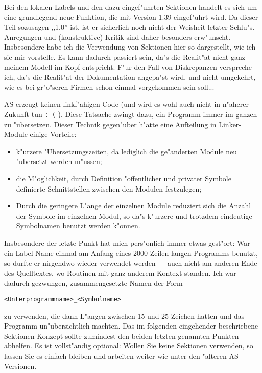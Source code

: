 \documentclass[12pt,a4paper,twoside]{report}
\newcommand{\tty}[1]{{\tt #1}}
\begin{document}
Bei den lokalen Labels und den dazu eingef"uhrten Sektionen handelt es
sich um eine grundlegend neue Funktion, die mit Version 1.39 eingef"uhrt
wird.  Da dieser Teil sozusagen ,,1.0'' ist, ist er sicherlich noch nicht
der Weisheit letzter Schlu"s.  Anregungen und (konstruktive) Kritik sind
daher besonders erw"unscht.  Insbesondere habe ich die Verwendung von
Sektionen hier so dargestellt, wie ich sie mir vorstelle.  Es kann dadurch
passiert sein, da"s die Realit"at nicht ganz meinem Modell im Kopf entspricht.
F"ur den Fall von Diskrepanzen verspreche ich, da"s die Realit"at der
Dokumentation angepa"st wird, und nicht umgekehrt, wie es bei gr"o"seren
Firmen schon einmal vorgekommen sein soll...
\par
AS erzeugt keinen linkf"ahigen Code (und wird es wohl auch nicht in n"aherer
Zukunft tun \tty{:-(} ).  Diese Tatsache zwingt dazu, ein Programm immer im ganzen
zu "ubersetzen.  Dieser Technik gegen"uber h"atte eine Aufteilung in
Linker-Module einige Vorteile:
\begin{itemize}
\item{k"urzere "Ubersetzungszeiten, da lediglich die ge"anderten Module
      neu "ubersetzt werden m"ussen;}
\item{die M"oglichkeit, durch Definition "offentlicher und privater
      Symbole definierte Schnittstellen zwischen den Modulen festzulegen;}
\item{Durch die geringere L"ange der einzelnen Module reduziert sich die
      Anzahl der Symbole im einzelnen Modul, so da"s k"urzere und trotzdem
      eindeutige Symbolnamen benutzt werden k"onnen.}
\end{itemize}
Insbesondere der letzte Punkt hat mich pers"onlich immer etwas gest"ort:
War ein Label-Name einmal am Anfang eines 2000 Zeilen langen Programms
benutzt, so durfte er nirgendwo wieder verwendet werden --- auch nicht am
anderen Ende des Quelltextes, wo Routinen mit ganz anderem Kontext standen.
Ich war dadurch gezwungen, zusammengesetzte Namen der Form
\begin{verbatim}
<Unterprogrammname>_<Symbolname>
\end{verbatim}
zu verwenden, die dann L"angen zwischen 15 und 25 Zeichen hatten und das
Programm un"ubersichtlich machten.
Das im folgenden eingehender beschriebene Sektionen-Konzept sollte zumindest
den beiden letzten genannten Punkten abhelfen.  Es ist vollst"andig optional:
Wollen Sie keine Sektionen verwenden, so lassen Sie es einfach bleiben
und arbeiten weiter wie unter den "alteren AS-Versionen.
\end{document}
